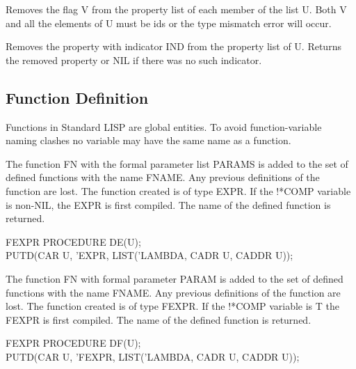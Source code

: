 {Removes the flag V from the property list of each member of the list
U. Both V and all the elements of U must be ids or the type mismatch
error will occur.}


{Removes the property with indicator IND from the property list of U.
Returns the removed property or NIL if there was no such indicator.}



\subsection{Function Definition}
\label{fdef}
Functions in Standard LISP are global entities. To avoid
function-variable naming clashes no variable may have the same name as
a function. 


{The function FN with the formal parameter list PARAMS is added to the
set of defined functions with the name FNAME. Any previous definitions
of the function are lost. The function created is of type
EXPR.  If the !*COMP variable is non-NIL, the EXPR is first
compiled. The name of the defined function is returned.

{\tt \begin{tabbing} FEXPR PROCEDURE DE(U); \\
\hspace*{1em} PUTD(CAR U, 'EXPR, LIST('LAMBDA, CADR U, CADDR U));
\end{tabbing}}}


{The function FN with formal parameter PARAM is added to the set of
defined functions with the name FNAME. Any previous definitions of the
function are lost. The function created is of type FEXPR.
 
If the !*COMP variable is T the FEXPR is first compiled. The name of
the defined function is returned.

{\tt \begin{tabbing} FEXPR PROCEDURE DF(U); \\
\hspace*{1em} PUTD(CAR U, 'FEXPR, LIST('LAMBDA, CADR U, CADDR U)); \\
\end{tabbing} }}


